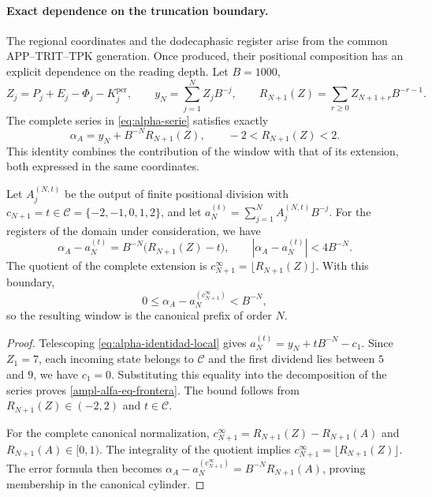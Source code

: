 \paragraph{Exact dependence on the truncation boundary.}
\label{ampl-alfa-frontera-exacta}
The regional coordinates and the dodecaphasic register arise from the
common APP--TRIT--TPK generation. Once produced, their positional
composition has an explicit dependence on the reading
depth. Let $B=1000$,
\[
 Z_j=P_j+E_j-\Phi_j-K_j^{\mathrm{per}},\qquad
 y_N=\sum_{j=1}^{N}Z_jB^{-j},\qquad
 R_{N+1}(Z)=\sum_{r\geq0}Z_{N+1+r}B^{-r-1}.
\]
The complete series in \eqref{eq:alpha-serie} satisfies exactly
\[
 \alpha_A=y_N+B^{-N}R_{N+1}(Z),\qquad
 -2<R_{N+1}(Z)<2.
\]
This identity combines the contribution of the window with that of its
extension, both expressed in the same coordinates.

\begin{proposition}
\label{ampl-alfa-prop-frontera}
Let $A_j^{(N,t)}$ be the output of finite positional division with
$c_{N+1}=t\in\mathcal C=\{-2,-1,0,1,2\}$, and let
$a_N^{(t)}=\sum_{j=1}^{N}A_j^{(N,t)}B^{-j}$. For the registers of the
domain under consideration, we have
\begin{equation}
 \alpha_A-a_N^{(t)}
 =B^{-N}\bigl(R_{N+1}(Z)-t\bigr),
 \qquad
 |\alpha_A-a_N^{(t)}|<4B^{-N}.
 \label{ampl-alfa-eq-frontera}
\end{equation}
The quotient of the complete extension is
$c_{N+1}^{\infty}=\lfloor R_{N+1}(Z)\rfloor$. With this boundary,
\[
 0\leq\alpha_A-a_N^{(c_{N+1}^{\infty})}<B^{-N},
\]
so the resulting window is the canonical prefix of order $N$.
\end{proposition}
\begin{proof}
Telescoping \eqref{eq:alpha-identidad-local} gives
$a_N^{(t)}=y_N+tB^{-N}-c_1$. Since $Z_1=7$, each incoming state
belongs to $\mathcal C$ and the first dividend lies between $5$ and $9$,
we have $c_1=0$. Substituting this equality into the decomposition of the
series proves \eqref{ampl-alfa-eq-frontera}. The bound follows from
$R_{N+1}(Z)\in(-2,2)$ and $t\in\mathcal C$.

For the complete canonical normalization,
$c_{N+1}^{\infty}=R_{N+1}(Z)-R_{N+1}(A)$ and
$R_{N+1}(A)\in[0,1)$. The integrality of the quotient implies
$c_{N+1}^{\infty}=\lfloor R_{N+1}(Z)\rfloor$. The error formula
then becomes
$\alpha_A-a_N^{(c_{N+1}^{\infty})}=B^{-N}R_{N+1}(A)$, proving
membership in the canonical cylinder.
\end{proof}

